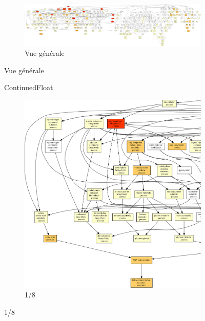 \begin{figure}
\begin{subfigure}{\textwidth}
\includegraphics[width=\textwidth]
{Figures/hlc-go-all-graph/hlc-go-all-graph.png}
\caption{Vue générale}
\end{subfigure}
\end{figure}

\begin{figure}[p]
ContinuedFloat
\begin{subfigure}{\textwidth}
\includegraphics[width=\textwidth]
{Figures/hlc-go-all-graph/hlc-go-all-graph_0.png}
\caption{1/8}
\end{subfigure}
\end{figure}

